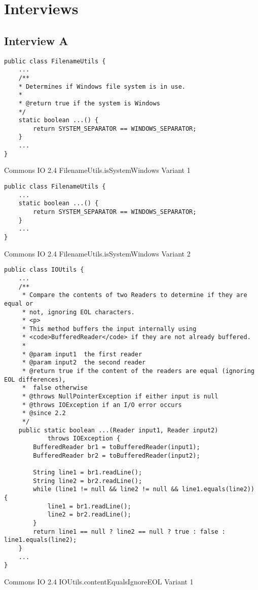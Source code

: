 \section{Interviews}
\label{appendix:interviews}


\subsection{Interview A}

\begin{code}
\begin{verbatim}
public class FilenameUtils {
	...
	/**
	* Determines if Windows file system is in use.
	* 
	* @return true if the system is Windows
	*/
	static boolean ...() {
		return SYSTEM_SEPARATOR == WINDOWS_SEPARATOR;
	}
	...
}
\end{verbatim}
\caption{Commons IO 2.4 FilenameUtils.isSystemWindows Variant 1}
\label{lst:filenameutils-issystemwindows-variant1}
\end{code}

\begin{code}
\begin{verbatim}
public class FilenameUtils {
	...
	static boolean ...() {
		return SYSTEM_SEPARATOR == WINDOWS_SEPARATOR;
	}
	...
}
\end{verbatim}
\caption{Commons IO 2.4 FilenameUtils.isSystemWindows Variant 2}
\label{lst:filenameutils-issystemwindows-variant2}
\end{code}

\begin{code}
\begin{verbatim}
public class IOUtils {
	...
    /**
     * Compare the contents of two Readers to determine if they are equal or
     * not, ignoring EOL characters.
     * <p>
     * This method buffers the input internally using
     * <code>BufferedReader</code> if they are not already buffered.
     *
     * @param input1  the first reader
     * @param input2  the second reader
     * @return true if the content of the readers are equal (ignoring EOL differences), 
     *	false otherwise
     * @throws NullPointerException if either input is null
     * @throws IOException if an I/O error occurs
     * @since 2.2
     */
    public static boolean ...(Reader input1, Reader input2)
            throws IOException {
        BufferedReader br1 = toBufferedReader(input1);
        BufferedReader br2 = toBufferedReader(input2);

        String line1 = br1.readLine();
        String line2 = br2.readLine();
        while (line1 != null && line2 != null && line1.equals(line2)) {
            line1 = br1.readLine();
            line2 = br2.readLine();
        }
        return line1 == null ? line2 == null ? true : false : line1.equals(line2);
    }
    ...
}
\end{verbatim}
\caption{Commons IO 2.4 IOUtils.contentEqualsIgnoreEOL Variant 1}
\label{lst:ioutils.contentequalsignoreeol-variant1}
\end{code}

